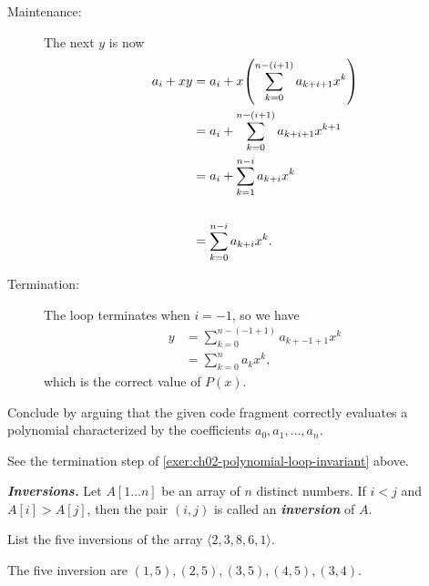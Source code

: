 \documentclass[Chapter02]{subfiles}
\begin{document}
\begin{problems}
\begin{problems}
\begin{answer}
\begin{description}
					\item[Maintenance:] The next $y$ is now
					\begin{align*}
						a_i + xy &= a_i + x\qty(\sum_{k = 0}^{n - (i + 1)} a_{k + i + 1}x^k)\\
							&= a_i + \sum_{k = 0}^{n - (i + 1)} a_{k + i + 1}x^{k + 1}\\
							&= a_i + \sum_{k = 1}^{n - i} a_{k + i}x^k\\\\
							&= \sum_{k = 0}^{n - i} a_{k + i}x^k.
					\end{align*}

					\item[Termination:] The loop terminates when $i = -1$, so we have
					\begin{align*}
						y &= \sum_{k = 0}^{n - (-1 + 1)} a_{k + -1 + 1}x^k\\
							&= \sum_{k = 0}^{n} a_kx^k,
					\end{align*}
					which is the correct value of $P(x)$.
				\end{description}
			\end{answer}
			
			\item Conclude by arguing that the given code fragment correctly evaluates a polynomial characterized by the coefficients $a_0, a_1, \dots, a_n$.
			\begin{answer}
				See the termination step of \ref{exer:ch02-polynomial-loop-invariant} above.
			\end{answer}
			
		\end{problems}
		
		\item \textbf{\textit{Inversions.}} Let $A[1 \dots n]$ be an array of $n$ distinct numbers. If $i < j$ and $A[i] > A[j]$, then the pair $(i,j)$ is called an \textbf{\textit{inversion}} of $A$.
		\begin{problems}
			\item List the five inversions of the array $\langle 2, 3, 8, 6, 1 \rangle$.
			\begin{answer}
				The five inversion are $(1,5), (2,5), (3,5), (4,5), (3,4)$.
			\end{answer}


\end{problems}
\end{problems}
\end{document}
